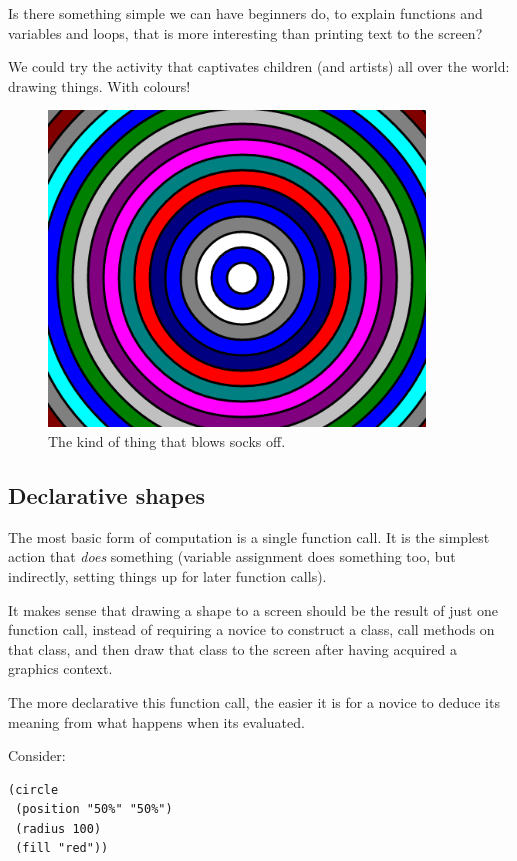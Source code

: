 Is there something simple we can have beginners do, to explain functions
and variables and loops, that is more interesting than printing text to
the screen?

We could try the activity that captivates children (and artists) all
over the world: drawing things. With colours!

\begin{figure}[ht!]
\centering
\includegraphics[width=100mm]{img/concentric_circles.png}
\caption{The kind of thing that blows socks off.}
\label{overflow}
\end{figure}

\subsection{Declarative shapes}

The most basic form of computation is a single function call. It is the
simplest action that \emph{does} something (variable assignment does
something too, but indirectly, setting things up for later function
calls).

It makes sense that drawing a shape to a screen should be the result of
just one function call, instead of requiring a novice to construct a
class, call methods on that class, and then draw that class to the
screen after having acquired a graphics context.

The more declarative this function call, the easier it is for a novice
to deduce its meaning from what happens when its evaluated.

Consider: 

\begin{verbatim}
(circle
 (position "50%" "50%")
 (radius 100)
 (fill "red"))
\end{verbatim}

